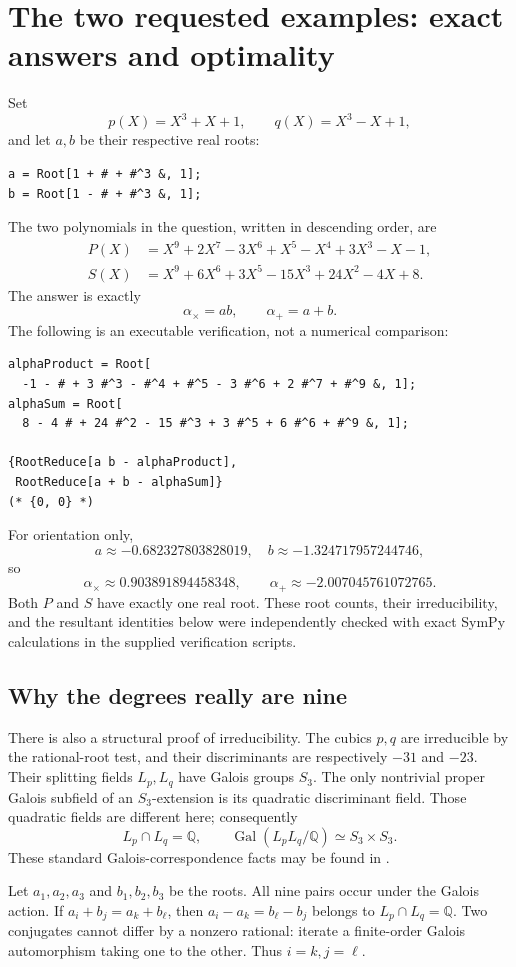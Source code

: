 \documentclass[11pt]{article}
\newcommand{\Q}{\mathbb Q}
\newcommand{\Gal}{\operatorname{Gal}}
\theoremstyle{definition}\newtheorem{definition}[theorem]{Definition}
\theoremstyle{remark}\newtheorem{remark}[theorem]{Remark}
\begin{document}
\section{The two requested examples: exact answers and optimality}
\label{sec:examples}
Set
\[
 p(X)=X^3+X+1,\qquad q(X)=X^3-X+1,
\]
and let $a,b$ be their respective real roots:
\begin{lstlisting}
a = Root[1 + # + #^3 &, 1];
b = Root[1 - # + #^3 &, 1];
\end{lstlisting}
The two polynomials in the question, written in descending order, are
\begin{align}
 P(X)&=X^9+2X^7-3X^6+X^5-X^4+3X^3-X-1,\label{eq:P}\\
 S(X)&=X^9+6X^6+3X^5-15X^3+24X^2-4X+8.\label{eq:S}
\end{align}
The answer is exactly
\[
 \boxed{\alpha_\times=ab,\qquad \alpha_+=a+b.}
\]
The following is an executable verification, not a numerical comparison:
\begin{lstlisting}
alphaProduct = Root[
  -1 - # + 3 #^3 - #^4 + #^5 - 3 #^6 + 2 #^7 + #^9 &, 1];
alphaSum = Root[
  8 - 4 # + 24 #^2 - 15 #^3 + 3 #^5 + 6 #^6 + #^9 &, 1];

{RootReduce[a b - alphaProduct],
 RootReduce[a + b - alphaSum]}
(* {0, 0} *)
\end{lstlisting}
For orientation only,
\[
 a\approx-0.682327803828019,\quad
 b\approx-1.324717957244746,
\]
so
\[
 \alpha_\times\approx0.903891894458348,\qquad
 \alpha_+\approx-2.007045761072765.
\]
Both $P$ and $S$ have exactly one real root. These root counts, their
irreducibility, and the resultant identities below were independently checked
with exact SymPy calculations in the supplied verification scripts.

\subsection{Why the degrees really are nine}
There is also a structural proof of irreducibility. The cubics $p,q$ are
irreducible by the rational-root test, and their discriminants are respectively
$-31$ and $-23$. Their splitting fields $L_p,L_q$ have Galois groups $S_3$.
The only nontrivial proper Galois subfield of an $S_3$-extension is its quadratic
discriminant field. Those quadratic fields are different here; consequently
\[
 L_p\cap L_q=\Q,\qquad
 \Gal(L_pL_q/\Q)\simeq S_3\times S_3.
\]
These standard Galois-correspondence facts may be found in \cite{milne}.

Let $a_1,a_2,a_3$ and $b_1,b_2,b_3$ be the roots. All nine pairs occur under
the Galois action. If $a_i+b_j=a_k+b_\ell$, then
$a_i-a_k=b_\ell-b_j$ belongs to $L_p\cap L_q=\Q$.
Two conjugates cannot differ by a nonzero rational: iterate a finite-order
Galois automorphism taking one to the other. Thus $i=k,j=\ell$.
\end{document}
